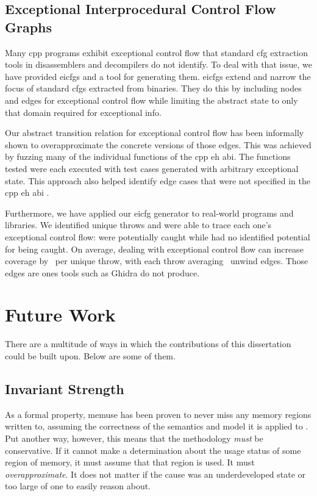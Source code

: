 \subsection{Exceptional Interprocedural Control Flow Graphs}
Many \gls{cpp} programs exhibit exceptional control flow that standard \gls{cfg} extraction tools in disassemblers and decompilers do not identify.
To deal with that issue, we have provided \glspl{eicfg} and a tool for generating them.
\Glspl{eicfg} extend and narrow the focus of standard \glspl{cfg} extracted from binaries.
They do this by including nodes and edges for exceptional control flow while limiting the abstract state to only that domain required for exceptional info.

Our abstract transition relation for exceptional control flow has been informally shown to overapproximate the concrete versions of those edges.
This was achieved by fuzzing many of the individual functions of the \gls{cpp} \gls{eh} \gls{abi}.
The functions tested were each executed with  test cases generated with arbitrary exceptional state.
This approach also helped identify edge cases that were not specified in the \gls{cpp} \gls{eh} \gls{abi} \cite{cxxEhAbi}.

Furthermore, we have applied our \gls{eicfg} generator to  real-world programs and libraries.
We identified  unique throws and were able to trace each one's exceptional control flow:  were potentially caught while  had no identified potential for being caught.
On average, dealing with exceptional control flow can increase coverage by \avgdiffinst\ per unique throw, with each throw averaging \avgunwinds\ unwind edges.
Those edges are ones tools such as Ghidra do not produce.

\section{Future Work}
There are a multitude of ways in which the contributions of this dissertation could be built upon.
Below are some of them.

\subsection{Invariant Strength}
As a formal property, \gls{memuse} has been proven to never miss any memory regions written to, assuming the correctness of the semantics and model it is applied to \autocite{bockenek2019preservation,verbeek2022lifting}.
Put another way, however, this means that the methodology \emph{must} be conservative.
If it cannot make a determination about the usage status of some region of memory,
it must assume that that region is used. It must \emph{overapproximate}.%
It does not matter if the cause was an underdeveloped state or too large of one to easily reason about.

